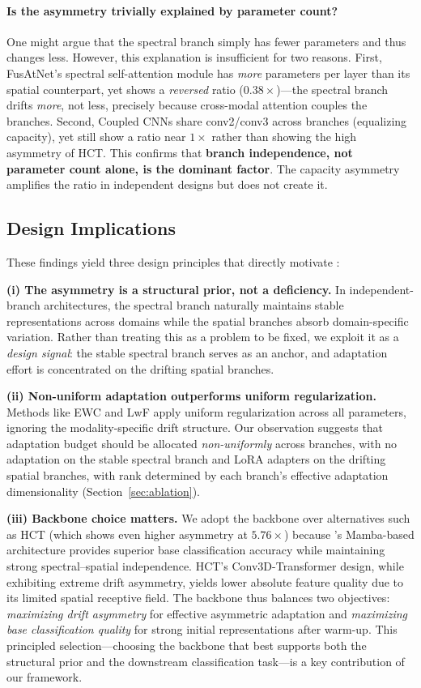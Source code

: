 \paragraph{Is the asymmetry trivially explained by parameter count?}
One might argue that the spectral branch simply has fewer parameters and thus changes less.
However, this explanation is insufficient for two reasons.
First, FusAtNet's spectral self-attention module has \emph{more} parameters per layer than its spatial counterpart, yet shows a \emph{reversed} ratio ($0.38\times$)---the spectral branch drifts \emph{more}, not less, precisely because cross-modal attention couples the branches.
Second, Coupled CNNs share conv2/conv3 across branches (equalizing capacity), yet still show a ratio near $1\times$ rather than showing the high asymmetry of HCT.
This confirms that \textbf{branch independence, not parameter count alone, is the dominant factor}.
The capacity asymmetry amplifies the ratio in independent designs but does not create it.

\subsection{Design Implications}
\label{sec:obs_implications}

These findings yield three design principles that directly motivate \methodname{}:

\textbf{(i) The asymmetry is a structural prior, not a deficiency.}
In independent-branch architectures, the spectral branch naturally maintains stable representations across domains while the spatial branches absorb domain-specific variation.
Rather than treating this as a problem to be fixed, we exploit it as a \emph{design signal}: the stable spectral branch serves as an anchor, and adaptation effort is concentrated on the drifting spatial branches.

\textbf{(ii) Non-uniform adaptation outperforms uniform regularization.}
Methods like EWC and LwF apply uniform regularization across all parameters, ignoring the modality-specific drift structure.
Our observation suggests that adaptation budget should be allocated \emph{non-uniformly} across branches, with no adaptation on the stable spectral branch and LoRA adapters on the drifting spatial branches, with rank determined by each branch's effective adaptation dimensionality (Section~\ref{sec:ablation}).

\textbf{(iii) Backbone choice matters.}
We adopt the \backbonename{} backbone over alternatives such as HCT (which shows even higher asymmetry at $5.76\times$) because \backbonename{}'s Mamba-based architecture provides superior base classification accuracy while maintaining strong spectral--spatial independence.
HCT's Conv3D-Transformer design, while exhibiting extreme drift asymmetry, yields lower absolute feature quality due to its limited spatial receptive field.
The \backbonename{} backbone thus balances two objectives: \emph{maximizing drift asymmetry} for effective asymmetric adaptation and \emph{maximizing base classification quality} for strong initial representations after warm-up.
This principled selection---choosing the backbone that best supports both the structural prior and the downstream classification task---is a key contribution of our framework.
